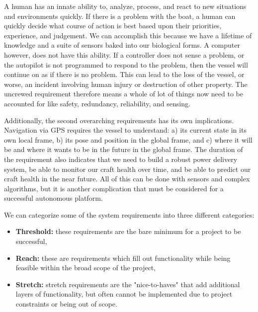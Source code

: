 A human has an innate ability to, analyze, process, and react to new situations and environments quickly.
If there is a problem with the boat, a human can quickly decide what course of action is best based upon their priorities, experience, and judgement.
We can accomplish this because we have a lifetime of knowledge and a suite of sensors baked into our biological forms.
A computer however, does not have this ability.
If a controller does not sense a problem, or the autopilot is not programmed to respond to the problem, then the vessel will continue on as if there is no problem.
This can lead to the loss of the vessel, or worse, an incident involving human injury or destruction of other property.
The uncrewed requirement therefore means a whole of lot of things now need to be accounted for like safety, redundancy, reliability, and sensing.

Additionally, the second overarching requirements has its own implications.
Navigation via GPS requires the vessel to understand: a) its current state in its own local frame, b) its pose and position in the global frame, and c) where it will be and where it wants to be in the future in the global frame.
The duration of the requirement also indicates that we need to build a robust power delivery system, be able to monitor our craft health over time, and be able to predict our craft health in the near future.
All of this can be done with sensors and complex algorithms, but it is another complication that must be considered for a successful autonomous platform.


We can categorize some of the system requirements into three different categories:

\begin{itemize}
    \item \textbf{Threshold:} these requirements are the bare minimum for a project to be successful,
    \item \textbf{Reach:} these are requirements which fill out functionality while being feasible within the broad scope of the project,
    \item \textbf{Stretch:} stretch requirements are the "nice-to-haves" that add additional layers of functionality, but often cannot be implemented due to project constraints or being out of scope.
\end{itemize}

